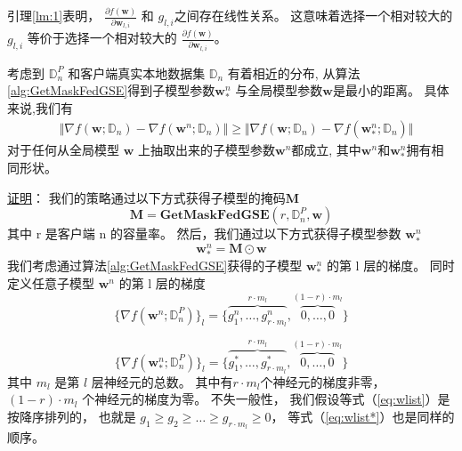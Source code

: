 引理\ref{lm:1}表明， 
$\frac{\partial f(\mathbf{w})}{\partial \mathbf{w}_{l,i}}$ 
和
$g_{l,i}$之间存在线性关系。
这意味着选择一个相对较大的$g_{l,i}$
等价于选择一个相对较大的
$\frac{\partial f(\mathbf{w})}{\partial \mathbf{w}_{l,i}}$。

\begin{theorem}\label{theorem:1} 
    考虑到 $\mathbb{D}^P_n$ 和客户端真实本地数据集 $\mathbb{D}_n$ 有着相近的分布,    
    从算法\ref{alg:GetMaskFedGSE}得到子模型参数$\mathbf{w}^n_*$
    与全局模型参数$\mathbf{w}$是最小的距离。
    具体来说,我们有
    \begin{align*}
        &  \Vert \nabla{f( \mathbf{w}; \mathbb{D}_n) } - \nabla{ f( \mathbf{w}^n; \mathbb{D}_n ) } \Vert \geq 
    \Vert \nabla{f( \mathbf{w}; \mathbb{D}_n) } - \nabla{ f( \mathbf{w}^n_*; \mathbb{D}_n ) } \Vert
    \end{align*}
    对于任何从全局模型 $\mathbf{w}$ 上抽取出来的子模型参数$\mathbf{w}^n$都成立, 
    其中$\mathbf{w}^n$和$\mathbf{w}^n_*$拥有相同形状。
\end{theorem}
\underline{证明}：
我们的策略通过以下方式获得子模型的掩码$\mathbf{M}$ 
\begin{equation}
    \label{eq:getmask}
    \mathbf{M} = \textbf{GetMaskFedGSE}(r, \mathbb{D}^P_n , \mathbf{w})  %
\end{equation}
其中 r 是客户端 n 的容量率。
然后，我们通过以下方式获得子模型参数 $\mathbf{w}^n_*$
\begin{equation}
    \label{eq:getw}
    \mathbf{w}^n_* = \mathbf{M} \odot \mathbf{w}
\end{equation}
我们考虑通过算法\ref{alg:GetMaskFedGSE}获得的子模型
$\mathbf{w}^n_*$
的第 l 层的梯度。
同时定义任意子模型
$\mathbf{w}^n$
的第 l 层的梯度
\begin{equation}
    \label{eq:wlist}
    \{\nabla{f(\mathbf{w}^n;\mathbb{D}^P_n)}\}_l = 
    \{ \overbrace{g_1^n, \dots , g_{r \cdot m_l}^n}^{r \cdot m_l }, 
    \overbrace{0, \dots, 0}^{(1-r) \cdot m_l}  \}
\end{equation}

\begin{equation}
    \label{eq:wlist*}
    \{\nabla{f(\mathbf{w}^n_*;\mathbb{D}^P_n)}\}_l = 
    \{ \overbrace{g_1^*, \dots , g_{r \cdot m_l}^*}^{r \cdot m_l }, 
    \overbrace{0, \dots, 0}^{(1-r) \cdot m_l}  \}
\end{equation}
其中 $m_l$ 是第 $l$ 层神经元的总数。
其中有$r \cdot m_l$个神经元的梯度非零，
$(1-r) \cdot m_l$ 个神经元的梯度为零。
不失一般性，
我们假设等式（\ref{eq:wlist}）是按降序排列的，
也就是
$g_1 \geq g_2 \geq \dots \geq g_{r \cdot m_l} \geq 0$，
等式（\ref{eq:wlist*}）也是同样的顺序。

